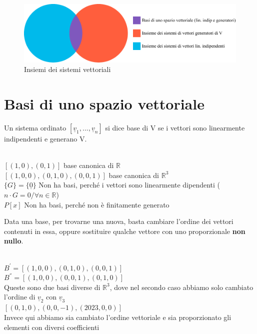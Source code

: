 \begin{figure}[H]
	\centering
	\includegraphics[height=0.24\textwidth]{Figures/insiemi sistemi vettoriali.pdf}
	\caption[Caption]{Insiemi dei sistemi vettoriali}
	\label{fig:insiemisistemivett}
\end{figure}

\section{Basi di uno spazio vettoriale}

Un sistema ordinato $[\underline{v}_1,...,\underline{v}_n]$ si dice base di V se i vettori sono linearmente indipendenti e generano V.
\begin{nota}
	\phantom{}\\
	$[(1,0),(0,1)]$ base canonica di $\mathbb{R}$\\
	$[(1,0,0),(0,1,0),(0,0,1)]$ base canonica di $\mathbb{R}^3$\\
	$\{G\}=\{\underline{0}\}$ Non ha basi, perché i vettori sono linearmente dipendenti ($n\cdot G=0/\forall n\in \mathbb{R}$)\\
	$P[x]$ Non ha basi, perché non è finitamente generato
\end{nota}

Data una base, per trovarne una nuova, basta cambiare l'ordine dei vettori contenuti in essa, oppure sostituire qualche vettore con uno proporzionale \textbf{non nullo}.

\begin{es}
	\phantom{}\\
	$B^{'}=[(1,0,0),(0,1,0),(0,0,1)]$\\
	$B^{''}=[(1,0,0),(0,0,1),(0,1,0)]$\\
	Queste sono due basi diverse di $\mathbb{R}^3$, dove nel secondo caso abbiamo solo cambiato l'ordine di $\underline{v}_2$ con $\underline{v}_3$\\
	$[(0,1,0),(0,0,-1),(2023,0,0)]$\\
	Invece qui abbiamo sia cambiato l'ordine vettoriale e sia proporzionato gli elementi con diversi coefficienti
\end{es}


